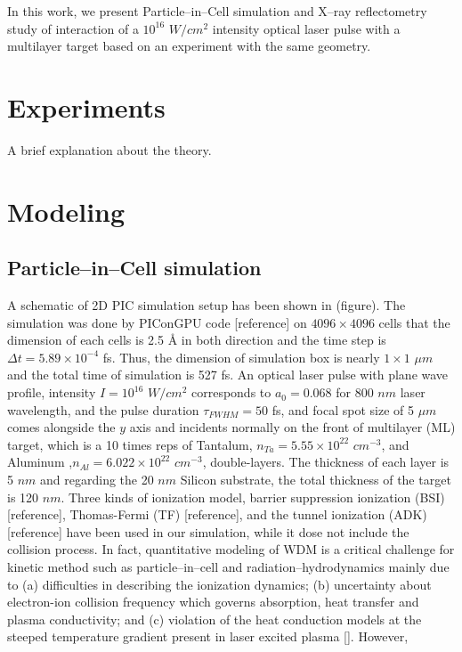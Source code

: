 \documentclass[preprint, 12pt]{elsarticle}
\begin{document}
In this work, we present Particle--in--Cell simulation and X--ray reflectometry study of interaction of a $10^{16}$ $W/cm^2$ intensity optical laser pulse with a multilayer target based on an experiment with the same geometry.

\section{Experiments}

A brief explanation about the theory.

\section{Modeling}
\label{S:2}
\subsection{Particle--in--Cell simulation}
A schematic of 2D PIC simulation setup has been shown in (figure). The simulation was done by PIConGPU code [reference] on $4096 \times 4096$ cells that the dimension of each cells is 2.5 {\AA} in both direction and the time step is ${\Delta}t=5.89 \times 10^{-4}$ fs. Thus, the dimension of simulation box is nearly $1 \times 1$ $\mu m$ and the total time of simulation is 527 fs. An optical laser pulse with plane wave profile, intensity $I = 10^{16}$ $W/{cm}^2$ corresponds to $a_{0} = 0.068$ for 800 $nm$ laser wavelength, and the pulse duration $\tau_{FWHM}=50$ fs, and focal spot size of 5 $\mu m$  comes alongside the $y$ axis and incidents normally on the front of multilayer (ML) target, which is a 10 times reps of Tantalum, $n_{Ta} = 5.55 \times 10^{22}$ $cm^{-3}$, and Aluminum ,$n_{Al} = 6.022 \times 10^{22}$ $cm^{-3}$, double-layers. The thickness of each layer is 5 $nm$ and regarding the 20 $nm$ Silicon substrate, the total thickness of the target is 120 $nm$. Three kinds of ionization model, barrier suppression ionization (BSI) [reference], Thomas-Fermi (TF) [reference], and the tunnel ionization (ADK) [reference] have been used in our simulation, while it dose not include the collision process. In fact, quantitative modeling of WDM is a critical challenge for kinetic method such as particle--in--cell and radiation--hydrodynamics mainly due to (a) difficulties in describing the ionization dynamics; (b) uncertainty about electron-ion collision frequency which governs absorption, heat transfer and plasma conductivity; and (c) violation of the heat conduction models at the steeped temperature gradient present in laser excited plasma []. However,
\end{document}
